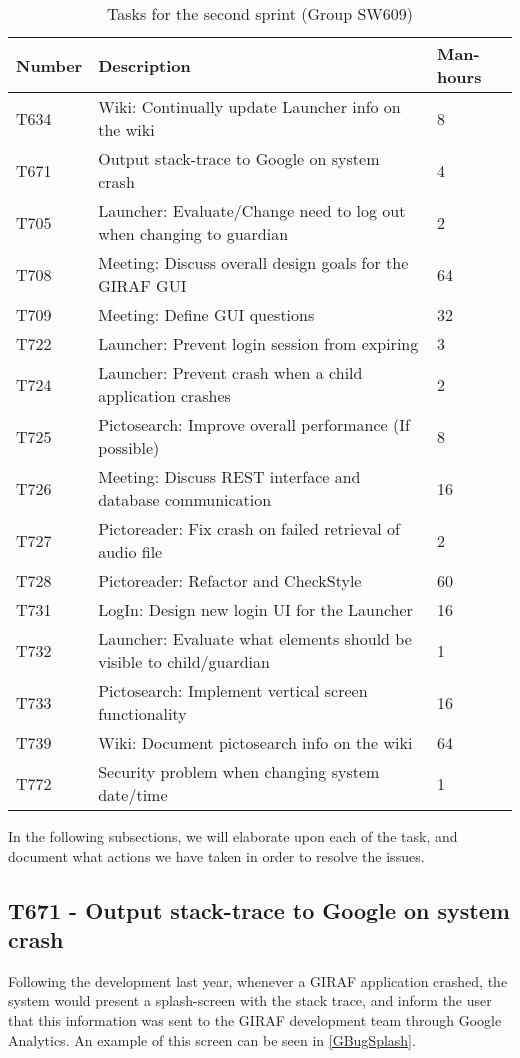 \begin{table}[H]
\centering
\begin{tabular}{|l|l|l|}
\hline
Number	& Description & Man-hours												\\\hline
T634  	& Wiki: Continually update Launcher info on the wiki & 8\\\hline 
T671    & Output stack-trace to Google on system crash & 4
\\\hline 
T705	& Launcher: Evaluate/Change need to log out when changing  to guardian
& 2 \\\hline 
T708    & Meeting: Discuss overall design goals for the GIRAF GUI & 64\\\hline
T709	& Meeting: Define GUI questions & 32 \\\hline 
T722   	& Launcher: Prevent login session from expiring & 3 \\\hline 
T724   	& Launcher: Prevent crash when a child application crashes & 2\\\hline 
T725  	& Pictosearch: Improve overall performance (If possible)	& 8 \\\hline 
T726    & Meeting: Discuss REST interface and database communication & 16
\\\hline 
T727    & Pictoreader: Fix crash on failed retrieval of audio file  & 2				\\\hline 
T728	& Pictoreader: Refactor and CheckStyle  & 60\\\hline
T731    & LogIn: Design new login UI for the Launcher & 16     			\\\hline
T732    & Launcher: Evaluate what elements should be visible to
child/guardian & 1\\\hline 
T733    & Pictosearch: Implement vertical screen functionality & 16   		
\\\hline 
T739    & Wiki: Document pictosearch info on the wiki & 64	\\\hline
T772    & Security problem when changing system date/time & 1 \\\hline
\end{tabular}
\caption{Tasks for the second sprint (Group SW609)} 
\label{SprintTwoTasks}    
\end{table} 

In the following subsections, we will elaborate upon each of the task, and
document what actions we have taken in order to resolve the issues.

\newpage
\subsection{T671 - Output stack-trace to Google on system crash}
Following the development last year, whenever a GIRAF application crashed, the
system would present a splash-screen with the stack trace, and inform the user
that this information was sent to the GIRAF development team through Google
Analytics. An example of this screen can be seen in \autoref{GBugSplash}.

